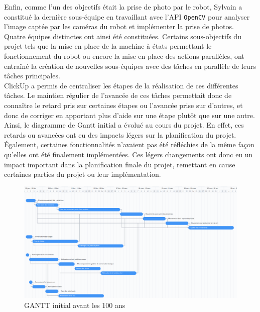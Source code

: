 \documentclass[a4paper,french]{article}
\begin{document}
Enfin, comme l'un des objectifs était la prise de photo par le robot, Sylvain a constitué la dernière sous-équipe en travaillant avec l'API \texttt{OpenCV} pour analyser l'image captée par les caméras du robot et implémenter la prise de photos. \\

Quatre équipes distinctes ont ainsi été constituées. Certains sous-objectifs du projet tels que la mise en place de la machine à états permettant le fonctionnement du robot ou encore la mise en place des actions parallèles, ont entraîné la création de nouvelles sous-équipes avec des tâches en parallèle de leurs tâches principales. \\

ClickUp a permis de centraliser les étapes de la réalisation de ces différentes tâches. Le maintien régulier de l'avancée de ces tâches permettait donc de connaître le retard pris sur certaines étapes ou l'avancée prise sur d'autres, et donc de corriger en apportant plus d'aide sur une étape plutôt que sur une autre. \\ Ainsi, le diagramme de Gantt initial a évolué au cours du projet. En effet, ces retards ou avancées ont eu des impacts légers sur la planification du projet. \'Egalement, certaines fonctionnalités n'avaient pas été réfléchies de la même façon qu'elles ont été finalement implémentées. Ces légers changements ont donc eu un impact important dans la planification finale du projet, remettant en cause certaines parties du projet ou leur implémentation. \\

\begin{figure}[H]
    \centering
    \includegraphics[scale=0.35]{figures/gantt_avant_100_ans.png}
    \caption{GANTT initial avant les 100 ans}
\end{figure}
\end{document}
